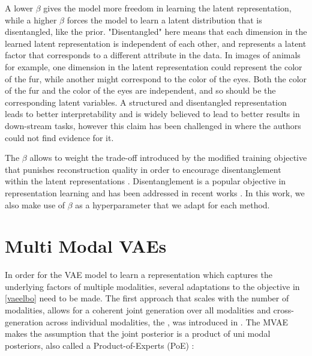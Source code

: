 A lower $\beta$ gives the model more freedom in learning the latent representation, while a higher $\beta$ forces the model to learn a latent distribution that is disentangled, like the prior.
"Disentangled" here means that each dimension in the learned latent representation is independent of each other, and represents a latent factor that corresponds to a different attribute in the data.
In images of animals for example, one dimension in the latent representation could represent the color of the fur, while another might correspond to the color of the eyes.
Both the color of the fur and the color of the eyes are independent, and so should be the corresponding latent variables.
A structured and disentangled representation leads to better interpretability and is widely believed to lead to better results in down-stream tasks, however this claim has been challenged in \citep{locatello_challenging_2019} where the authors could not find evidence for it.

The $\beta$ allows to weight the trade-off introduced by the modified training objective that punishes reconstruction quality in order to encourage disentanglement within the latent representations \citep{burgess_understanding_2018}.
Disentanglement is a popular objective in representation learning and has been addressed in recent works \parencite{chen_isolating_2019, locatello_challenging_2019}.
In this work, we also make use of $\beta$ as a hyperparameter that we adapt for each method.



\section{Multi Modal VAEs}
\label{subsec:Multi Modal VAEs}
In order for the VAE model to learn a representation which captures the underlying factors of multiple modalities, several adaptations to the objective in \cref{vaeelbo} need to be made.
The first approach that scales with the number of modalities, allows for a coherent joint generation over all modalities and cross-generation across individual modalities, the , was introduced in \citep{poe}.
The MVAE makes the assumption that the joint posterior is a product of uni modal posteriors, also called a Product-of-Experts (PoE) \parencite{hinton_training_2002}:

